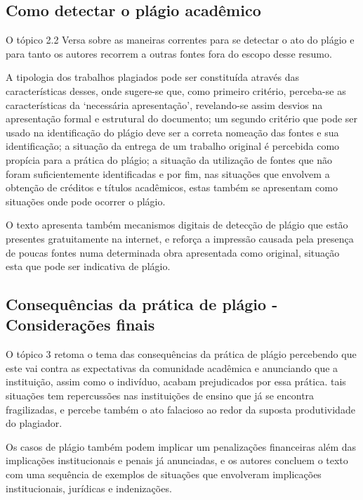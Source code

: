 \documentclass[
   article,       %
   12pt,          %
   oneside,       %
   a4paper,       %
   english,       %
   brazil,           %
   sumario=tradicional
   ]{abntex2}
\begin{document}
\subsection{Como detectar o plágio acadêmico}


O tópico 2.2 Versa sobre as maneiras correntes para se detectar o ato do plágio e para tanto os autores recorrem a outras fontes fora do escopo desse resumo.

A tipologia dos trabalhos plagiados pode ser constituída através das características desses, onde sugere-se que, como primeiro critério, perceba-se as  características da ‘necessária apresentação’, revelando-se assim desvios na apresentação formal e estrutural do documento; um segundo critério que pode ser usado na identificação do plágio deve ser a correta nomeação das fontes e sua identificação; a situação da entrega de um trabalho original é percebida como propícia para a prática do plágio; a situação da utilização de fontes que não foram suficientemente identificadas e por fim, nas situações que envolvem a obtenção de créditos e títulos acadêmicos, estas também se apresentam como situações onde pode ocorrer o plágio.


O texto apresenta também mecanismos digitais de detecção de plágio que estão presentes gratuitamente na internet, e reforça a impressão causada pela presença de poucas fontes numa determinada obra apresentada como original, situação esta que pode ser indicativa de plágio.


\subsection{Consequências da prática de plágio - Considerações finais}


O tópico 3 retoma o tema das consequências da prática de plágio percebendo que este vai contra as expectativas da comunidade acadêmica e anunciando que a instituição, assim como o indivíduo, acabam prejudicados por essa prática. tais situações tem repercussões nas instituições de ensino que já se encontra fragilizadas, e percebe também o ato falacioso ao redor da suposta produtividade do plagiador.




Os casos de plágio também podem implicar um penalizações financeiras além das implicações institucionais e penais já anunciadas, e os autores concluem o texto com uma sequência de exemplos de situações que envolveram implicações institucionais, jurídicas e indenizações.


\postextual


\end{document}
